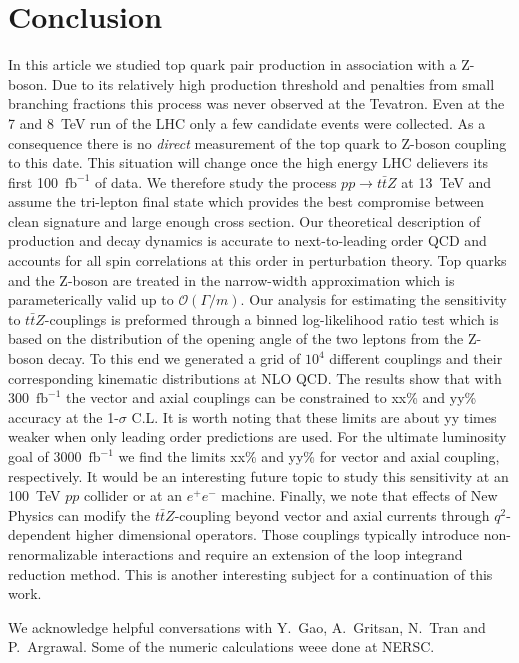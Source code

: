 \documentclass[preprint]{JHEP3} %
\def\ttbZ{t\bar{t}Z}
\def\invfb {\mathrm{fb}^{-1}}
\begin{document}
\section{Conclusion}
In this article we studied top quark pair production in association with a Z-boson.
Due to its relatively high production threshold and 
penalties from small branching fractions 
this process was never observed at the Tevatron.
Even at the 7 and 8~TeV run of the LHC only a few candidate events were collected.
As a consequence there is no {\it direct} measurement of the top quark to Z-boson coupling to this date. 
This situation will change once the high energy LHC delievers its first 100~$\invfb$ of data.
We therefore study the process $pp\to\ttbZ$ at 13~TeV and assume the tri-lepton final state  
which provides the best compromise between clean signature and large enough cross section. 
Our theoretical description of production and decay dynamics is accurate to next-to-leading order QCD and
accounts for all spin correlations at this order in perturbation theory. 
Top quarks and the Z-boson are treated in the narrow-width approximation which is parameterically valid up to $\mathcal{O}(\Gamma \big/ m)$.
Our analysis for estimating the sensitivity to $\ttbZ$-couplings is preformed through a binned log-likelihood ratio test which is based on the 
distribution of the opening angle of the two leptons from the Z-boson decay.
To this end we generated a grid of $10^4$ different couplings and their corresponding kinematic distributions at NLO QCD. 
The results show that with 300~$\invfb$ the vector and axial couplings can be constrained to xx\% and yy\% accuracy at the 1-$\sigma$ C.L.
It is worth noting that these limits are about yy times weaker when only leading order predictions are used. 
For the ultimate luminosity goal of 3000~$\invfb$ we find the limits xx\% and yy\% for vector and axial coupling, respectively.
It would be an interesting future topic to study this sensitivity at an 100~TeV $pp$ collider or at an $e^+ e^-$ machine.
Finally, we note that effects of New Physics can modify the $\ttbZ$-coupling beyond vector and axial currents through $q^2$-dependent  higher dimensional operators. 
Those couplings typically introduce non-renormalizable interactions and require an extension of the loop integrand reduction method. 
This is another interesting subject for a continuation of this work.



\acknowledgments
We acknowledge helpful conversations with Y.~Gao, A.~Gritsan, N.~Tran and P.~Argrawal. 
Some of the numeric calculations weee done at NERSC.





\end{document}
